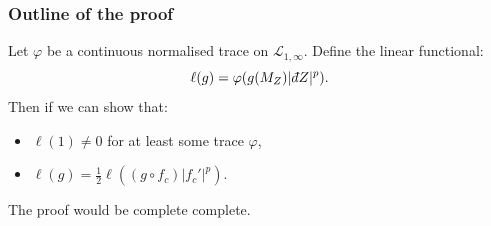 \documentclass{beamer} %
\theoremstyle{definition} %
\newcommand{\Cplx}{\mathbb{C}}
\newcommand{\Lc}{\mathcal{L}}
\def\qd{\,{\mathchar'26\mkern-12mu d}}
\begin{document}
\begin{frame}\frametitle{Outline of the proof}
    Let $\varphi$ be a continuous normalised trace on $\Lc_{1,\infty}$. Define the linear functional:
    \begin{equation*}
        \ell(g) = \varphi(g(M_Z)|\qd Z|^p).
    \end{equation*}
    Then if we can show that:
    \begin{itemize}
        \item{} $\ell(1) \neq 0$ for at least some trace $\varphi$,
        \item{} $\ell(g) = \frac{1}{2}\ell((g\circ f_c)|f_c'|^p)$.
    \end{itemize}
    The proof would be complete complete.
\end{frame}

% 
%     
% 
\end{document}
